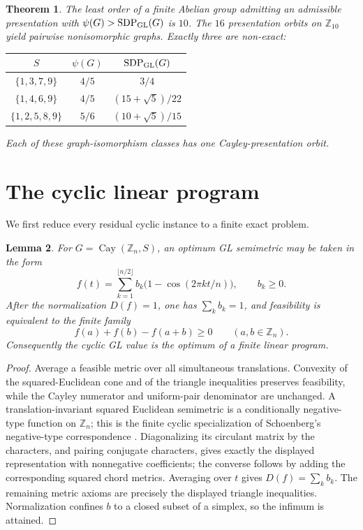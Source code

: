 \documentclass[11pt]{article}
\newtheorem{theorem}{Theorem}
\newtheorem{lemma}[theorem]{Lemma}
\DeclareMathOperator{\Cay}{Cay}
\DeclareMathOperator{\SDP}{SDP}
\begin{document}
\begin{theorem}\label{thm:main}
The least order of a finite Abelian group admitting an admissible presentation
with $\psi(G)>\SDP_{\rm GL}(G)$ is $10$.  The $16$ presentation orbits on
$\mathbb Z_{10}$ yield pairwise nonisomorphic graphs.  Exactly three are
non-exact:
\begin{center}
\begin{tabular}{c@{\qquad}c@{\qquad}c}
\toprule
$S$ & $\psi(G)$ & $\SDP_{\rm GL}(G)$\\
\midrule
$\{1,3,7,9\}$ & $4/5$ & $3/4$\\
$\{1,4,6,9\}$ & $4/5$ & $(15+\sqrt5)/22$\\
$\{1,2,5,8,9\}$ & $5/6$ & $(10+\sqrt5)/15$\\
\bottomrule
\end{tabular}
\end{center}
Each of these graph-isomorphism classes has one Cayley-presentation orbit.
\end{theorem}

\section{The cyclic linear program}

We first reduce every residual cyclic instance to a finite exact problem.

\begin{lemma}\label{lem:fourier}
For $G=\Cay(\mathbb Z_n,S)$, an optimum GL semimetric may be taken in the
form
\[
 f(t)=\sum_{k=1}^{\lfloor n/2\rfloor}b_k
 \bigl(1-\cos(2\pi kt/n)\bigr),\qquad b_k\geq0.
\]
After the normalization $D(f)=1$, one has $\sum_k b_k=1$, and feasibility is
equivalent to the finite family
\[
 f(a)+f(b)-f(a+b)\geq0\qquad(a,b\in\mathbb Z_n).
\]
Consequently the cyclic GL value is the optimum of a finite linear program.
\end{lemma}

\begin{proof}
Average a feasible metric over all simultaneous translations.  Convexity of
the squared-Euclidean cone and of the triangle inequalities preserves
feasibility, while the Cayley numerator and uniform-pair denominator are
unchanged.  A translation-invariant squared Euclidean semimetric is a
conditionally negative-type function on $\mathbb Z_n$; this is the finite
cyclic specialization of Schoenberg's negative-type correspondence
\cite{Schoenberg1938}.  Diagonalizing its
circulant matrix by the characters, and pairing conjugate characters, gives
exactly the displayed representation with nonnegative coefficients; the
converse follows by adding the corresponding squared chord metrics.  Averaging
over $t$ gives $D(f)=\sum_k b_k$.  The remaining metric axioms are precisely
the displayed triangle inequalities.  Normalization confines $b$ to a closed
subset of a simplex, so the infimum is attained.
\end{proof}
\end{document}
